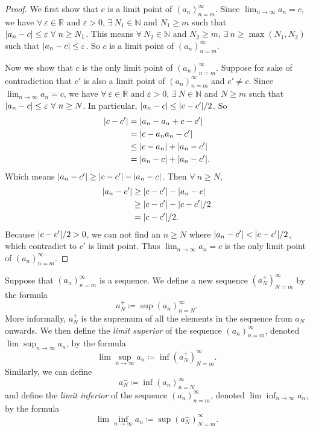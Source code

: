\begin{proof}
We first show that \(c\) is a limit point of \((a_n)_{n = m}^\infty\).
Since \(\lim_{n \to \infty} a_n = c\), we have \(\forall\ \varepsilon \in \mathds{R}\) and \(\varepsilon > 0\), \(\exists\ N_1 \in \mathds{N}\) and \(N_1 \geq m\) such that \(\abs*{a_n - c} \leq \varepsilon \ \forall\ n \geq N_1\).
This means \(\forall\ N_2 \in \mathds{N}\) and \(N_2 \geq m\), \(\exists\ n \geq \max(N_1, N_2)\) such that \(\abs*{a_n - c} \leq \varepsilon\).
So \(c\) is a limit point of \((a_n)_{n = m}^\infty\).

Now we show that \(c\) is the only limit point of \((a_n)_{n = m}^\infty\).
Suppose for sake of contradiction that \(c'\) is also a limit point of \((a_n)_{n = m}^\infty\) and \(c' \neq c\).
Since \(\lim_{n \to \infty} a_n = c\), we have \(\forall\ \varepsilon \in \mathds{R}\) and \(\varepsilon > 0\), \(\exists\ N \in \mathds{N}\) and \(N \geq m\) such that \(\abs*{a_n - c} \leq \varepsilon \ \forall\ n \geq N\).
In particular, \(\abs*{a_n - c} \leq \abs*{c - c'} / 2\).
So
\begin{align*}
\abs*{c - c'} &= \abs*{a_n - a_n + c - c'} \\
&= \abs*{c - a_n a_n - c'} \\
&\leq \abs*{c - a_n} + \abs*{a_n - c'} \\
&= \abs*{a_n - c} + \abs*{a_n - c'}.
\end{align*}
Which means \(\abs*{a_n - c'} \geq \abs*{c - c'} - \abs*{a_n - c}\).
Then \(\forall\ n \geq N\),
\begin{align*}
\abs*{a_n - c'} &\geq \abs*{c - c'} - \abs*{a_n - c} \\
&\geq \abs*{c - c'} - \abs*{c - c'} / 2 \\
&= \abs*{c - c'} / 2.
\end{align*}
Because \(\abs*{c - c'} / 2 > 0\), we can not find an \(n \geq N\) where \(\abs*{a_n - c'} < \abs*{c - c'} / 2\), which contradict to \(c'\) is limit point.
Thus \(\lim_{n \to \infty} a_n = c\) is the only limit point of \((a_n)_{n = m}^\infty\).
\end{proof}

\begin{definition}\label{6.4.6}
Suppose that \((a_n)_{n = m}^\infty\) is a sequence.
We define a new sequence \((a_N^+)_{N = m}^\infty\) by the formula
\[
    a_N^+ \coloneqq \sup(a_n)_{n = N}^\infty.
\]
More informally, \(a_N^+\) is the supremum of all the elements in the sequence from \(a_N\) onwards.
We then define the \emph{limit superior} of the sequence \((a_n)_{n = m}^\infty\), denoted \(\lim\sup_{n \to \infty} a_n\), by the formula
\[
    \lim\sup_{n \to \infty} a_n \coloneqq \inf(a_N^+)_{N = m}^\infty.
\]
Similarly, we can define
\[
    a_N^- \coloneqq \inf(a_n)_{n = N}^\infty
\]
and define the \emph{limit inferior} of the sequence \((a_n)_{n = m}^\infty\), denoted \(\lim\inf_{n \to \infty} a_n\), by the formula
\[
    \lim\inf_{n \to \infty} a_n \coloneqq \sup(a_N^-)_{N = m}^\infty.
\]
\end{definition}

